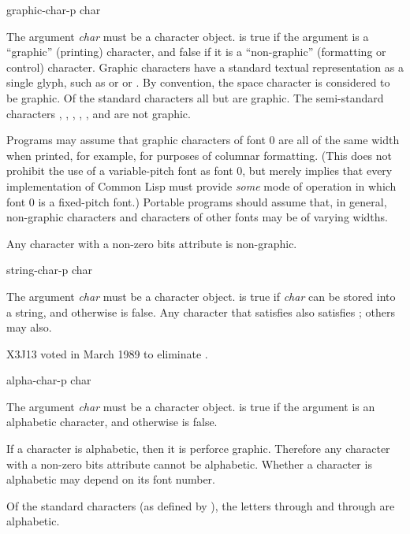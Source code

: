 \begin{defun}[Function]
graphic-char-p char

The argument {\it char} must be a character object.
 is true if the argument is a ``graphic'' (printing)
character, and false if it is a ``non-graphic'' (formatting or control)
character.  Graphic characters have a standard textual representation
as a single glyph, such as  or \cdf{*} or \cdf{=}.
By convention, the space character is considered to be graphic.
Of the standard characters
all but  are graphic.
The semi-standard characters
, , , , ,
and  are not graphic.

Programs may assume that
graphic characters of font 0 are all of the same width
when printed, for example, for purposes of columnar
formatting.  (This does not prohibit the use of a variable-pitch font
as font 0, but merely implies that every implementation of Common Lisp
must provide {\it some} mode of operation in which font 0 is
a fixed-pitch font.)
Portable programs should assume that, in general,
non-graphic characters and characters of
other fonts may be of varying widths.

Any character with a non-zero bits attribute is non-graphic.
\end{defun}

\begin{obsolete}
\begin{defun}[Function]
string-char-p char

The argument {\it char} must be a character object.
 is true if {\it char} can be stored into
a string, and otherwise is false.
Any character that satisfies 
also satisfies ; others may also.
\end{defun}
\end{obsolete}

\begin{newer}
X3J13 voted in March 1989 
to eliminate .
\end{newer}

\begin{defun}[Function]
alpha-char-p char

The argument {\it char} must be a character object.
 is true if the argument is an alphabetic
character, and otherwise is false.

If a character is alphabetic, then it is perforce graphic.
Therefore any character with a non-zero bits attribute cannot be alphabetic.
Whether a character is alphabetic may depend on its font number.

Of the standard characters (as defined by ),
the letters  through  and  through  are alphabetic.
\end{defun}

